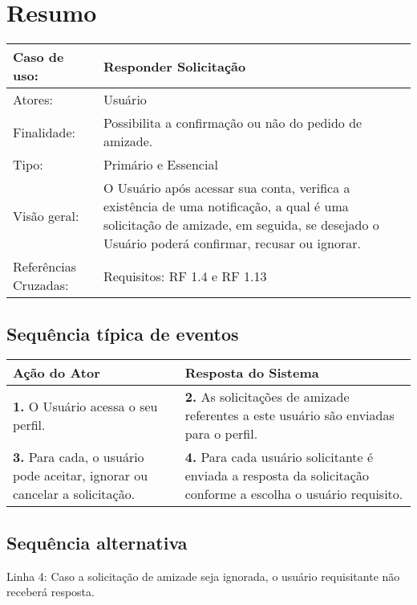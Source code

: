 \documentclass[12pt,a4paper,onecolumn,titlepage]{article}
\begin{document}
\section{Resumo}
\begin{table}[h!]
\begin{center}
\begin{tabular}{p{2.5cm} p{9.5cm}}
Caso de uso: & \textbf{Responder Solicitação} \\ \hline
Atores: & Usuário \\ \hline
Finalidade: & Possibilita a confirmação ou não do pedido de amizade. \\ \hline
Tipo: & Primário e Essencial\\ \hline
Visão geral: & O Usuário após acessar sua conta, verifica a existência de uma notificação, a qual é uma solicitação de amizade, em seguida, se desejado o Usuário poderá confirmar, recusar ou ignorar.\\ \hline
Referências Cruzadas: & Requisitos: RF 1.4 e RF 1.13 
\end{tabular}
\end{center}
\end{table}

\subsection{Sequência típica de eventos}
\begin{center}
\def\arraystretch{1.1}
\begin{tabular}{|p{6cm}|p{6cm}|}

\hline
\textbf{Ação do Ator} & \textbf{Resposta do Sistema} \\ \hline
\textbf{1.} O Usuário acessa o seu perfil. & \textbf{2.} As solicitações de amizade referentes a este usuário são enviadas para o perfil. \\ \hline
\textbf{3. } Para cada, o usuário pode aceitar, ignorar ou cancelar a solicitação. & \textbf{4.} Para cada usuário solicitante é enviada a resposta da solicitação conforme a escolha o usuário requisito. \\ \hline
\end{tabular}
\end{center}

\subsection{Sequência alternativa}
Linha 4: Caso a solicitação de amizade seja ignorada, o usuário requisitante não receberá resposta.
\end{document}
